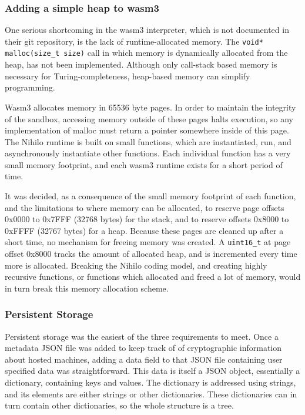 \documentclass{article}
\begin{document}
\subsubsection{Adding a simple heap to wasm3}

One serious shortcoming in the wasm3 interpreter, which is not documented in their git repository, is the lack of runtime-allocated memory. The \texttt{void* malloc(size\_t size)} call in which memory is dynamically allocated from the heap, has not been implemented. Although only call-stack based memory is necessary for Turing-completeness, heap-based memory can simplify programming.

Wasm3 allocates memory in 65536 byte pages.
In order to maintain the integrity of the sandbox, accessing memory outside of these pages halts execution, so any implementation of malloc must return a pointer somewhere inside of this page. The Nihilo runtime is built on small functions, which are instantiated, run, and asynchronously instantiate other functions. Each individual function has a very small memory footprint, and each wasm3 runtime exists for a short period of time.

It was decided, as a consequence of the small memory footprint of each function, and the limitations to where memory can be allocated, to reserve page offsets 0x0000 to 0x7FFF (32768 bytes) for the stack, and to reserve offsets 0x8000 to 0xFFFF (32767 bytes) for a heap. Because these pages are cleaned up after a short time, no mechanism for freeing memory was created. A \texttt{uint16\_t} at page offset 0x8000 tracks the amount of allocated heap, and is incremented every time more is allocated. Breaking the Nihilo coding model, and creating highly recursive functions, or functions which allocated and freed a lot of memory, would in turn break this memory allocation scheme.

\subsubsection{Persistent Storage}

Persistent storage was the easiest of the three requirements to meet. Once a metadata JSON file was added to keep track of of cryptographic information about hosted machines, adding a data field to that JSON file containing user specified data was straightforward. This data is itself a JSON object, essentially a dictionary, containing keys and values. The dictionary is addressed using strings, and its elements are either strings or other dictionaries. These dictionaries can in turn contain other dictionaries, so the whole structure is a tree.
\end{document}
